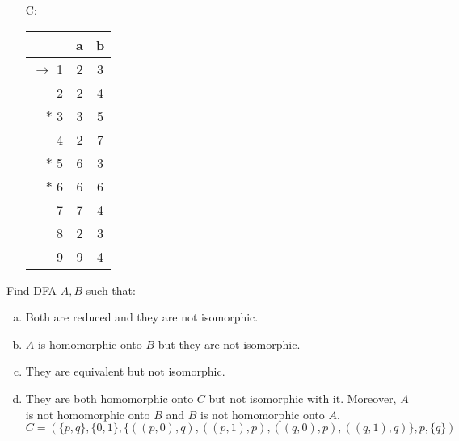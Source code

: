 \documentclass[a4paper,12pt]{amsart}
\begin{document}
\begin{problem}
\begin{multicols}{3}
\begin{itemize}
            \item[C:] \begin{tabular}{ r | c c }
            & a & b \\ \hline
            $\to$ 1 & 2 & 3 \\
            2 & 2 & 4 \\
            $\ast$ 3 & 3 & 5 \\
            4 & 2 & 7 \\
            $\ast$ 5 & 6 & 3 \\
            $\ast$ 6 & 6 & 6 \\
            7 & 7 & 4 \\
            8 & 2 & 3 \\
            9 & 9 & 4
            \end{tabular}
        \end{itemize} 

    \end{multicols}

\end{problem}

\vspace{-12pt}
\medskip\begin{problem} 
    
    Find DFA $A,B$ such that:    
    \begin{enumerate}[(a)]\setlength\itemsep{12pt}
        \item Both are reduced and they are not isomorphic. 
        \item $A$ is homomorphic onto $B$ but they are not isomorphic.
        \item They are equivalent but not isomorphic.
        \item They are both homomorphic onto $C$ but not isomorphic with it. Moreover, $A$ is not homomorphic onto $B$ and $B$ is not homomorphic onto $A$.
        $$
        C=(\{p,q\},\{0,1\},\{((p,0),q),((p,1),p),((q,0),p),((q,1),q)\},p,\{q\})
        $$
    \end{enumerate}

\end{problem}
\end{document}
